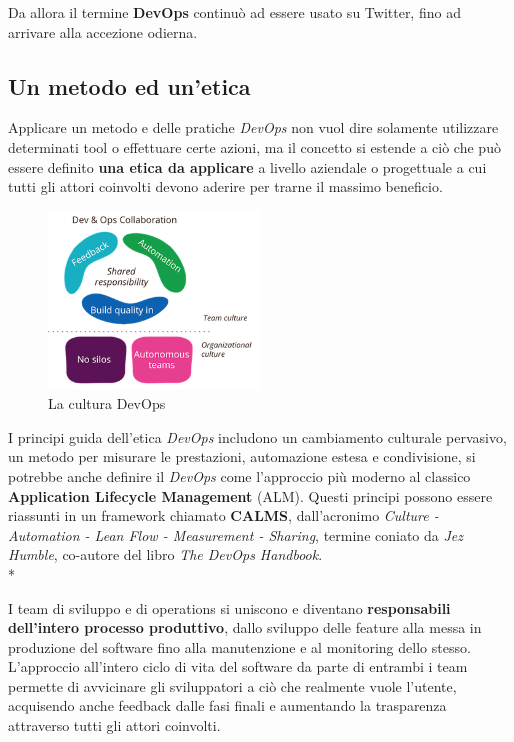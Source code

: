 \documentclass[a4paper,12pt]{report}
\begin{document}
				Da allora il termine \textbf{DevOps} continuò ad essere usato su Twitter, fino ad arrivare alla accezione odierna.
			
			\subsection{Un metodo ed un'etica}
			
				Applicare un metodo e delle pratiche \emph{DevOps} non vuol dire solamente utilizzare determinati tool o effettuare certe azioni, ma il concetto si estende a ciò che può essere definito \textbf{una etica da applicare} a livello aziendale o progettuale a cui tutti gli attori coinvolti devono aderire per trarne il massimo beneficio.
				
				\begin{figure}[h]
					\centering
					\includegraphics[width=0.5\textwidth]{devops_culture}
					\caption{La cultura DevOps}
					\label{fig:devops_culture}
				\end{figure}
				
				I principi guida dell'etica \emph{DevOps} includono un cambiamento culturale pervasivo, un metodo per misurare le prestazioni, automazione estesa e condivisione, si potrebbe anche definire il \emph{DevOps} come l'approccio più moderno al classico \textbf{Application Lifecycle Management} (ALM). Questi principi possono essere riassunti in un framework chiamato \textbf{CALMS}, dall'acronimo \emph{Culture - Automation - Lean Flow - Measurement - Sharing}, termine coniato da \emph{Jez Humble}, co-autore del libro \emph{The DevOps Handbook}.\\*
				
				I team di sviluppo e di operations si uniscono e diventano \textbf{responsabili dell'intero processo produttivo}, dallo sviluppo delle feature alla messa in produzione del software fino alla manutenzione e al monitoring dello stesso. L'approccio all'intero ciclo di vita del software da parte di entrambi i team permette di avvicinare gli sviluppatori a ciò che realmente vuole l'utente, acquisendo anche feedback dalle fasi finali e aumentando la trasparenza attraverso tutti gli attori coinvolti.
			
\end{document}
